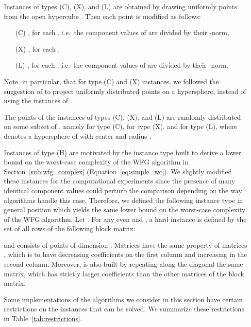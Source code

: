 \documentclass[a4paper,11pt]{article}
\begin{document}
\noindent Instances of types (C), (X), and (L) are obtained by drawing uniformly points 
from the open hypercube . Then each point  is modified as follows:
\begin{itemize}
  \item[(C)] , 
  for each , i.e.\ the component values of  are divided by
  their -norm,  \item[(X)] ,
  for each ,
  \item[(L)] , 
  for each , i.e.\ the component values of  are divided by
  their -norm.\end{itemize}

\noindent Note, in particular, that for type (C) and (X) instances, we followed the suggestion of \citet{RusFra14}
to project uniformly distributed points on a hypersphere, instead of using the instances of \citet{DebThiLauZit02}.

\noindent The points of the instances of types (C), (X), and (L) are randomly distributed on some subset of 
, namely 
 for type (C),  
 for type (X), and
 for type (L), 
where  denotes a hypersphere of  with center  and radius .



Instances of type (H) are motivated by the instance type built 
to derive a lower bound on the worst-case complexity of the WFG algorithm
in Section~\ref{sub:wfg_complex} (Equation~\ref{eq:simple_wc}).
We slightly modified these instances for the computational experiments
since the presence of many identical component values
could perturb the comparison depending on the way algorithms handle this case.
Therefore, we defined the following instance type in general position
which yields the same lower bound on the worst-case complexity of the WFG algorithm.
Let .
For any even  and , a hard instance 
is defined by the set of all rows of the following block matrix:

and consists of  points of dimension .
Matrices  have the same property of matrices ,
which is to have decreasing coefficients on the first column and increasing in the second column.
Moreover,  is also built by repeating along the diagonal
the same matrix, which has strictly larger coefficients
than the other matrices of the block matrix.

Some implementations of the algorithms we consider in this section 
have certain restrictions on the instances that can be solved. 
We summarize these restrictions in Table~\ref{tab:restrictions}.
\end{document}
